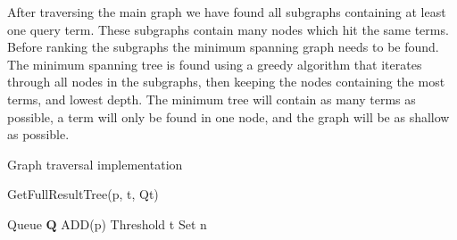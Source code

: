 After traversing the main graph we have found all subgraphs containing at least one query term. These subgraphs contain many nodes which hit the same terms. Before ranking the subgraphs the minimum spanning graph needs to be found. The minimum spanning tree is found using a greedy algorithm that iterates through all nodes in the subgraphs, then keeping the nodes containing the most terms, and lowest depth. The minimum tree will contain as many terms as possible, a term will only be found in one node, and the graph will be as shallow as possible.


Graph traversal implementation

\begin{algorithm}[H]
    \caption{GetFullResultTree(p, t, Qt)}
    \SetAlgoLined
    Queue $\mathbf{Q}$ ADD(p)\; Threshold t\; Set n \;
\end{algorithm}



